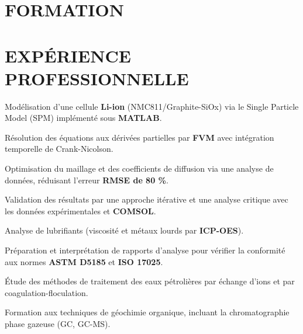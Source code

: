 \documentclass[10pt]{article}
\begin{document}

\section{FORMATION}

\section{EXPÉRIENCE PROFESSIONNELLE}
\begin{bul}
\item Modélisation d'une cellule \textbf{Li-ion} (NMC811/Graphite-SiOx) via le Single Particle Model (SPM) implémenté sous \textbf{MATLAB}.
\item Résolution des équations aux dérivées partielles par \textbf{FVM} avec intégration temporelle de Crank-Nicolson.
\item Optimisation du maillage et des coefficients de diffusion via une analyse de données, réduisant l'erreur \textbf{RMSE de 80 \%}.
\item Validation des résultats par une approche itérative et une analyse critique avec les données expérimentales et \textbf{COMSOL}.
\end{bul}
\begin{bul}
\item Analyse de lubrifiants (viscosité et métaux lourds par \textbf{ICP-OES}).
\item Préparation et interprétation de rapports d'analyse pour vérifier la conformité aux normes \textbf{ASTM D5185} et \textbf{ISO 17025}.
\end{bul}
\begin{bul}
\item Étude des méthodes de traitement des eaux pétrolières par échange d'ions et par coagulation-floculation.
\item Formation aux techniques de géochimie organique, incluant la chromatographie phase gazeuse (GC, GC-MS).
\end{bul}
\end{document}

